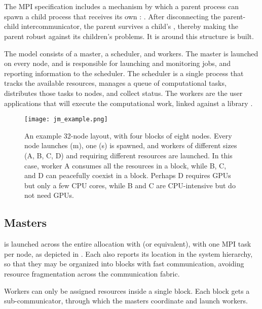 \section{\mpijm}

The MPI specification\cite{MPI} includes a mechanism by which a parent process can spawn a child process that receives its own \mpicommworld: \spawn.
After disconnecting the parent-child intercommunicator, the parent survives a child's \mpiabort, thereby making the parent robust against its children's problems.
It is around this structure \mpijm is built.

The \mpijm model consists of a master, a scheduler, and workers.
The master \jmmaster is launched on every node, and is responsible for launching and monitoring jobs, and reporting information to the scheduler.
The scheduler \jmscheduler is a single process that tracks the available resources, manages a queue of computational tasks, distributes those tasks to nodes, and collect status.
The workers are the user applications that will execute the computational work, linked against a library \jmworker.

\begin{figure}[t]
    \centering
        \texttt{[image: jm\_example.png]}
    \caption{An example 32-node layout, with four blocks of eight nodes.  Every node launches \jmmaster (m), one \jmscheduler (s) is spawned, and workers of different sizes (A, B, C, D) and requiring different resources are launched.  In this case, worker A consumes all the resources in a block, while B, C, and D can peacefully coexist in a block.  Perhaps D requires GPUs but only a few CPU cores, while B and C are CPU-intensive but do not need GPUs.}
    \label{fig:jm_example}
\end{figure}

\subsection{Masters}

\jmmaster is launched across the entire allocation with \mpirun (or equivalent), with one MPI task per node, as depicted in .
Each \jmmaster also reports its location in the system hierarchy, so that they may be organized into blocks with fast communication, avoiding resource fragmentation across the communication fabric.

Workers can only be assigned resources inside a single block.  Each block gets a sub-communicator, through which the masters coordinate and launch workers.


